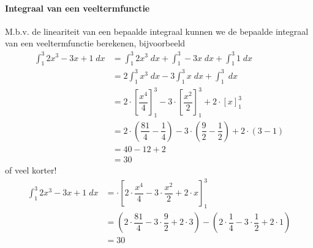 \documentclass[a4paper,12pt, twoside]{article}
\begin{document}
\paragraph*{Integraal van een veeltermfunctie}
M.b.v. de lineariteit van een bepaalde integraal kunnen we de bepaalde integraal van een veeltermfunctie berekenen, bijvoorbeeld
\begin{align*}
  \int_1^3 2x^3-3x+1 \;dx &= \int_1^3 2x^3 \;dx + \int_1^3 -3x \;dx + \int_1^3 1 \;dx\\
                          &= 2\int_1^3 x^3 \;dx - 3\int_1^3 x \;dx + \int_1^3 \;dx\\
                          &= 2\cdot\left[\dfrac{x^4}{4}\right]_1^3 - 3\cdot\left[\dfrac{x^2}{2}\right]_1^3 +2\cdot\left[x\right]_1^3\\
                          &= 2\cdot \left(\dfrac{81}{4}-\dfrac{1}{4}\right) - 3\cdot \left(\dfrac{9}{2}-\dfrac{1}{2}\right) + 2\cdot \left(3-1\right)\\
                          &= 40 - 12 + 2\\
                          &= 30
\end{align*}
of veel korter!
\begin{align*}
  \int_1^3 2x^3-3x+1 \;dx &= \cdot\left[2\cdot\dfrac{x^4}{4} - 3\cdot\dfrac{x^2}{2} +2\cdot x\right]_1^3\\
                          &= (2\cdot \dfrac{81}{4} - 3\cdot \dfrac{9}{2} + 2\cdot 3) - (2\cdot \dfrac{1}{4} - 3\cdot \dfrac{1}{2} + 2\cdot 1)\\
                          &= 30
\end{align*}
\end{document}

